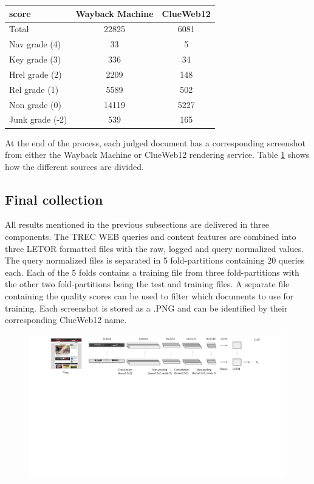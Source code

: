 \begin{table}[h]
  \begin{tabular}{ l | c | c  }
    score & Wayback Machine & ClueWeb12 \\
    \hline
    Total & 22825 & 6081 \\
    Nav grade (4) & 33 & 5 \\
    Key grade (3) & 336 & 34 \\
    Hrel grade (2) & 2209 & 148 \\
    Rel grade (1) & 5589 & 502 \\
    Non grade (0) & 14119 & 5227 \\
    Junk grade (-2) & 539 & 165 \\
    \hline
  \end{tabular}
   \label{tab:countsources} 
\end{table}

At the end of the process, each judged document has a corresponding screenshot from either the Wayback Machine or ClueWeb12 rendering service. Table \ref{tab:countsources} shows how the different sources are divided.

\subsection{Final collection}
All results mentioned in the previous subsections are delivered in three components. The TREC WEB queries and content features are combined into three LETOR formatted files with the raw, logged and query normalized values. The query normalized files is separated in 5 fold-partitions containing 20 queries each. Each of the 5 folds contains a training file from three fold-partitions with the other two fold-partitions being the test and training files. A separate file containing the quality scores can be used to filter which documents to use for training. Each screenshot is stored as a .PNG and can be identified by their corresponding ClueWeb12 name. 

\begin{figure}[t]
\centering
\includegraphics[clip,trim=0 10cm 0 0, width=20cm]{images/vip-features.pdf}
   \label{fig:ViPfeat} 
\end{figure}

